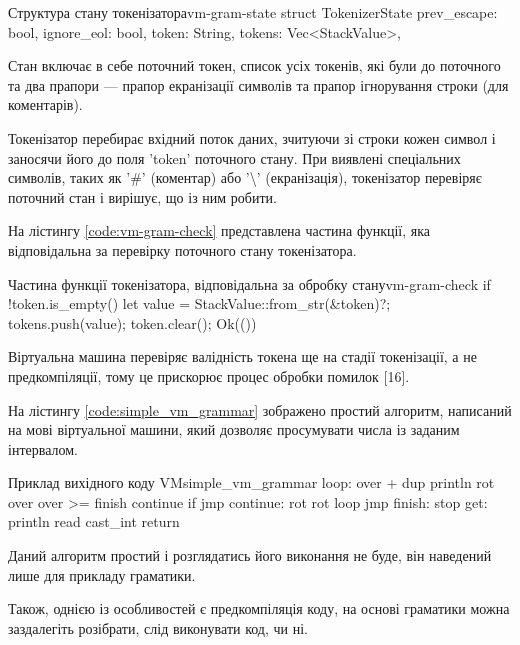 \documentclass{lib/styles/default-style}
\begin{document}
    \begin{stdout}{Структура стану токенізатора}{vm-gram-state}
        struct TokenizerState {
            prev_escape: bool,
            ignore_eol: bool,
            token: String,
            tokens: Vec<StackValue>,
        }\end{stdout}

    Стан включає в себе поточний токен, список усіх токенів, які були до поточного та два прапори --- прапор екранізації символів 
    та прапор ігнорування строки (для коментарів).

    Токенізатор перебирає вхідний поток даних, зчитуючи зі строки кожен символ і заносячи його до поля 'token' поточного стану.
    При виявлені спеціальних символів, таких як '\#' (коментар) або '\textbackslash' (екранізація), токенізатор перевіряє поточний стан і вирішує,
    що із ним робити.

    На лістингу \ref{code:vm-gram-check} представлена частина функції, яка відповідальна за перевірку поточного стану токенізатора.

    \begin{stdout}{Частина функції токенізатора, відповідальна за обробку стану}{vm-gram-check}
        if !token.is_empty() {
            let value = StackValue::from_str(&token)?;
            tokens.push(value);
            token.clear();
        }
        Ok(())\end{stdout}
    
    Віртуальна машина перевіряє валідність токена ще на стадії токенізації, а не предкомпіляції, тому це прискорює процес обробки
    помилок [16]. 

    На лістингу \ref{code:simple_vm_grammar} зображено простий алгоритм, написаний на мові віртуальної машини,
    який дозволяє просумувати числа із заданим інтервалом.
    
    \begin{stdout}{Приклад вихідного коду VM}{simple_vm_grammar}        
        loop:
        over + dup println
        rot over over
        >= finish continue if jmp
        continue:
        rot rot
        loop jmp
        finish:
        stop
        get:
        println read cast_int return\end{stdout}

    Даний алгоритм простий і розглядатись його виконання не буде, він наведений лише для прикладу граматики.
    
    Також, однією із особливостей є предкомпіляція коду, на основі граматики можна заздалегіть розібрати, слід виконувати код, чи ні.
\end{document}
